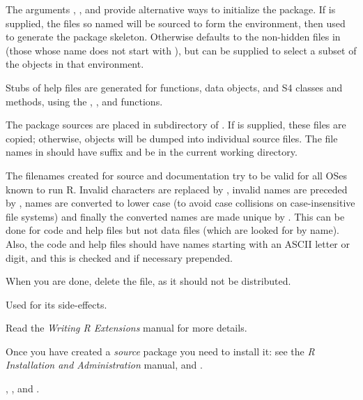 %
\begin{Details}\relax
The arguments , , and 
provide alternative ways to initialize the package.  If
 is supplied, the files so named will be sourced to
form the environment, then used to generate the package skeleton.
Otherwise  defaults to the non-hidden files in
 (those whose name does not start with ),
but can be supplied to select a subset of the objects in that
environment.

Stubs of help files are generated for functions, data objects, and
S4 classes and methods, using the ,
,  and  functions.

The package sources are placed in subdirectory  of
.  If  is supplied, these files are
copied; otherwise, objects will be dumped into individual source
files.
The file names in  should  have suffix  and
be in the current working directory.

The filenames created for source and documentation try to be valid for
all OSes known to run R.  Invalid characters are replaced by \samp{\_},
invalid names are preceded by , names are converted to lower
case (to avoid case collisions on case-insensitive file systems) and
finally the converted names are made unique by
.  This can be done for code and
help files but not data files (which are looked for by name). Also,
the code and help files should have names starting with an ASCII
letter or digit, and this is checked and if necessary 
prepended.

When you are done, delete the  file, as it
should not be distributed.
\end{Details}
%
\begin{Value}
Used for its side-effects.
\end{Value}
%
\begin{References}\relax
Read the \emph{Writing R Extensions} manual for more details.

Once you have created a \emph{source} package you need to install it:
see the \emph{R Installation and Administration} manual,
 and .
\end{References}
%
\begin{SeeAlso}\relax
{}, , and
.
\end{SeeAlso}
